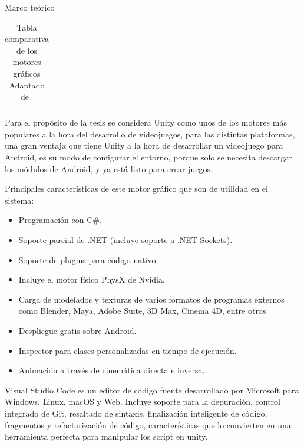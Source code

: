 \begin{thesischapter}{1} {Marco teórico}
\begin{table}[ht]
\begin{tabularx}{\textwidth}{|X|X|X|X|X|X|X|}
        \end{tabularx}
        \label{tab: graphics-engines}
        \caption{ Tabla comparativa de los motores gráficos \\ Adaptado de~\cite{gonjar2019desarrollo}}
    \end{table}
    
    
    \vspace{10pt}
    Para el propósito de la tesis se considera Unity como unos de los motores más populares a la hora del desarrollo de videojuegos, para las distintas plataformas, una gran ventaja que tiene Unity a la hora de desarrollar un videojuego para Android, es su modo de configurar el entorno, porque solo se necesita descargar los módulos de Android, y ya está listo para crear juegos.

    \vspace{5pt}
    Principales características de este motor gráfico que son de utilidad en el sistema:~\cite{unity3d}

    \begin{itemize}
        \item Programación con C\#.
        \item Soporte parcial de .NET (incluye soporte a .NET Sockets).
        \item Soporte de plugins para código nativo.
        \item Incluye el motor físico PhysX de Nvidia.
        \item Carga de modelados y texturas de varios formatos de programas externos como Blender, Maya, Adobe Suite, 3D Max, Cinema 4D, entre otros.
        \item Despliegue gratis sobre Android.
        \item Inspector para clases personalizadas en tiempo de ejecución.
        \item Animación a través de cinemática directa e inversa.
    \end{itemize}

    Visual Studio Code es un editor de código fuente desarrollado por Microsoft para Windows, Linux, macOS y Web. Incluye soporte para la depuración, control integrado de Git, resaltado de sintaxis, finalización inteligente de código, fragmentos y refactorización de código, características que lo convierten en una herramienta perfecta para manipular los script en unity.~\cite{vscode}


\end{thesischapter}
